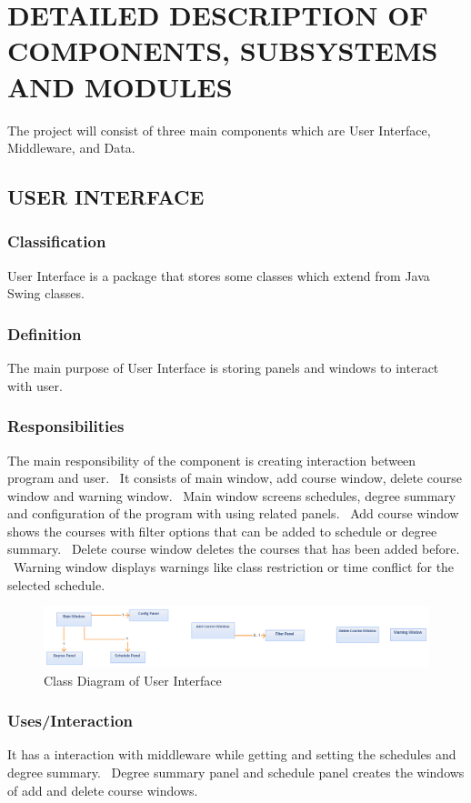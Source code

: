 \documentclass[twoside,letterpaper]{article}
\begin{document}
\clearpage\pagestyle{Standard}
\section{DETAILED DESCRIPTION OF COMPONENTS, SUBSYSTEMS AND MODULES}
\label{sec:description}

The project will consist of three main components which are User Interface, Middleware, and Data.

\subsection{USER INTERFACE}
\subsubsection{Classification}
User Interface is a package that stores some classes which extend from Java Swing classes. 
\subsubsection{Definition}
The main purpose of User Interface is storing panels and windows to interact with user.
\subsubsection{Responsibilities}
The main responsibility of the component is creating interaction between program and user. \ It 
consists of main window, add course window, delete course window and warning window. \ Main window 
screens schedules, degree summary and configuration of the program with using related panels. \ Add 
course window shows the courses with filter options that can be added to schedule or degree summary. 
\ Delete course window deletes the courses that has been added before. \ Warning window displays 
warnings like class restriction or time conflict for the selected schedule.
\begin{figure}[h]
\centering
\includegraphics[width=\linewidth]{ui.png}
\caption{Class Diagram of User Interface}
\end{figure}

\subsubsection{Uses/Interaction}
It has a interaction with middleware while getting and setting the schedules and degree summary. \ Degree summary panel and schedule panel creates the windows of add and delete course windows.
\end{document}
